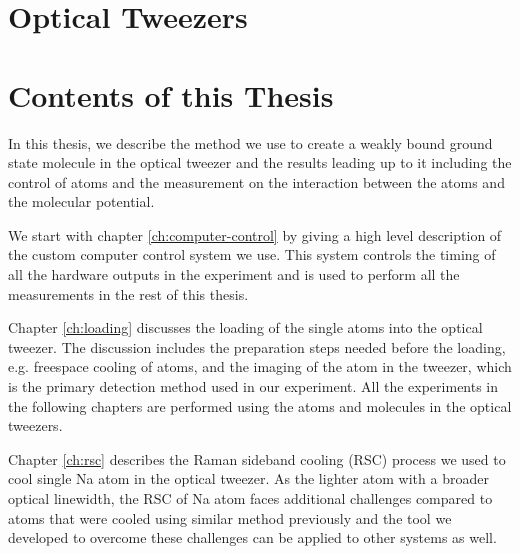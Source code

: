 

\section{Optical Tweezers}
\label{ch:introduction:tweezers}


\section{Contents of this Thesis}
\label{ch:introduction:contents}

In this thesis, we describe the method we use to create a weakly bound ground state molecule
in the optical tweezer and the results leading up to it including the control of atoms
and the measurement on the interaction between the atoms and the molecular potential.

We start with chapter \ref{ch:computer-control} by giving a high level description of
the custom computer control system we use.
This system controls the timing of all the hardware outputs in the experiment
and is used to perform all the measurements in the rest of this thesis.

Chapter \ref{ch:loading} discusses the loading of the single atoms into the optical tweezer.
The discussion includes the preparation steps needed before the loading,
e.g. freespace cooling of atoms,
and the imaging of the atom in the tweezer,
which is the primary detection method used in our experiment.
All the experiments in the following chapters are performed using
the atoms and molecules in the optical tweezers.

Chapter \ref{ch:rsc} describes the Raman sideband cooling (RSC) process
we used to cool single Na atom in the optical tweezer.
As the lighter atom with a broader optical linewidth,
the RSC of Na atom faces additional challenges compared to atoms
that were cooled using similar method previously
and the tool we developed to overcome these challenges can be applied to other systems as well.

